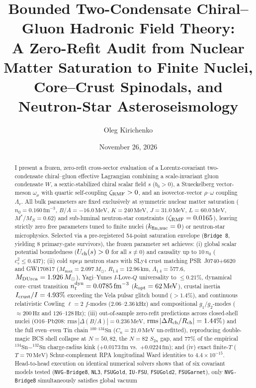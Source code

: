 \documentclass[aps,prc,twocolumn,superscriptaddress,nofootinbib,floatfix]{revtex4-2}
\begin{document}
\title{Bounded Two-Condensate Chiral--Gluon Hadronic Field Theory:\\
A Zero-Refit Audit from Nuclear Matter Saturation to Finite Nuclei, Core--Crust Spinodals, and Neutron-Star Asteroseismology}

\author{Oleg Kirichenko}

\date{November 26, 2026}

\begin{abstract}
I present a frozen, zero-refit cross-sector evaluation of a Lorentz-covariant two-condensate chiral--gluon effective Lagrangian combining a scale-invariant gluon condensate $W$, a sextic-stabilized chiral scalar field $s$ ($b_6 > 0$), a Stueckelberg vector-meson $\omega_\mu$ with quartic self-coupling $\zeta_{\rm RMF} > 0$, and an isovector-vector $\rho$--$\omega$ coupling $\Lambda_v$. All bulk parameters are fixed exclusively at symmetric nuclear matter saturation ($n_0 = 0.160\,\mathrm{fm}^{-3}$, $B/A = -16.0\,\mathrm{MeV}$, $K = 240\,\mathrm{MeV}$, $J = 31.0\,\mathrm{MeV}$, $L = 60.0\,\mathrm{MeV}$, $M^*/M_N = 0.62$) and sub-luminal neutron-star constraints ($\zeta_{\rm RMF} = 0.0165$), leaving strictly zero free parameters tuned to finite nuclei ($k_{\rm fin,nuc} = 0$) or neutron-star microphysics. Selected via a pre-registered 54-point saturation envelope (\texttt{Bridge 8}, yielding 8 primary-gate survivors), the frozen parameter set achieves: (i) global scalar potential boundedness ($U_{\rm ch}(s) > 0$ for all $s \neq 0$) and causality up to $10\,n_0$ ($c_s^2 \leq 0.437$); (ii) cold $npe\mu$ neutron stars with SLy4 crust matching PSR~J0740+6620 and GW170817 ($M_{\max} = 2.097\,M_\odot$, $R_{1.4} = 12.96\,\mathrm{km}$, $\Lambda_{1.4} = 577.6$, $M_{\rm DUrca} = 1.926\,M_\odot$), Yagi--Yunes $I$-Love-$Q$ universality to $\leq 0.21\%$, dynamical core--crust transition $n_t^{\rm dyn} = 0.0785\,\mathrm{fm}^{-3}$ ($k_{\rm opt} = 62\,\mathrm{MeV}$), crustal inertia $I_{\rm crust}/I = 4.93\%$ exceeding the Vela pulsar glitch bound ($>1.4\%$), and continuous relativistic Cowling $\ell=2$ $f$-modes ($2.06\text{--}2.36\,\mathrm{kHz}$) and compositional $g_1/g_2$-modes ($\approx 200\,\mathrm{Hz}$ and $126\text{--}128\,\mathrm{Hz}$); (iii) out-of-sample zero-refit predictions across closed-shell nuclei ($\mathrm{O16}\text{--}\mathrm{Pb208}$: $\mathrm{rms}\,|\Delta(B/A)| = 0.236\,\mathrm{MeV}$, $\mathrm{rms}\,|\Delta R_{\rm ch}/R_{\rm ch}| = 1.44\%$) and the full even--even Tin chain $^{100\text{--}134}\mathrm{Sn}$ ($C_n = 21.0\,\mathrm{MeV}$ un-refitted), reproducing double-magic BCS shell collapse at $N=50, 82$, the $N=82$ $S_{2n}$ gap, and $77\%$ of the empirical $^{134}\mathrm{Sn}-^{132}\mathrm{Sn}$ charge-radius kink ($+0.0173\,\mathrm{fm}$ vs.\ $+0.0224\,\mathrm{fm}$); and (iv) exact finite-$T$ ($T=70\,\mathrm{MeV}$) Schur-complement RPA longitudinal Ward identities to $4.4\times 10^{-15}$. Head-to-head execution on identical numerical solvers shows that of six covariant models tested (\texttt{NVG-Bridge8}, \texttt{NL3}, \texttt{FSUGold}, \texttt{IU-FSU}, \texttt{FSUGold2}, \texttt{FSUGarnet}), only \texttt{NVG-Bridge8} simultaneously satisfies global vacuum 
\end{abstract}
\end{document}
